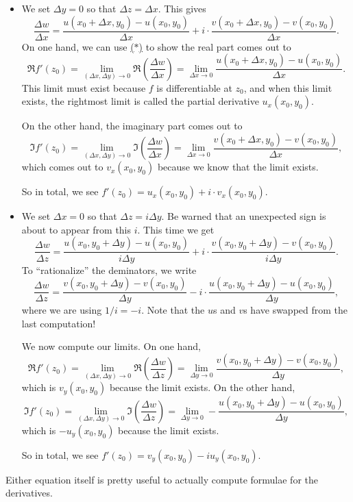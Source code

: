 \begin{itemize}
	\item We set $\Delta y=0$ so that $\Delta z=\Delta x$. This gives
	\[\frac{\Delta w}{\Delta x}=\frac{u(x_0+\Delta x,y_0)-u(x_0,y_0)}{\Delta x}+i\cdot\frac{v(x_0+\Delta x,y_0)-v(x_0,y_0)}{\Delta x}.\]
	On one hand, we can use \hyperref[eq:almostcauchyriemann]{($*$)} to show the real part comes out to
	\[\Re f'(z_0)=\lim_{(\Delta x,\Delta y)\to 0}\Re\left(\frac{\Delta w}{\Delta x}\right)=\lim_{\Delta x\to0}\frac{u(x_0+\Delta x,y_0)-u(x_0,y_0)}{\Delta x}.\]
	This limit must exist because $f$ is differentiable at $z_0$, and when this limit exists, the rightmost limit is called the partial derivative $u_x(x_0,y_0)$.
	
	On the other hand, the imaginary part comes out to
	\[\Im f'(z_0)=\lim_{(\Delta x,\Delta y)\to 0}\Im\left(\frac{\Delta w}{\Delta x}\right)=\lim_{\Delta x\to0}\frac{v(x_0+\Delta x,y_0)-v(x_0,y_0)}{\Delta x},\]
	which comes out to $v_x(x_0,y_0)$ because we know that the limit exists.

	So in total, we see $f'(z_0)=u_x(x_0,y_0)+i\cdot v_x(x_0,y_0)$.

	\item We set $\Delta x=0$ so that $\Delta z=i\Delta y$. Be warned that an unexpected sign is about to appear from this $i$. This time we get
	\[\frac{\Delta w}{\Delta z}=\frac{u(x_0,y_0+\Delta y)-u(x_0,y_0)}{i\Delta y}+i\cdot\frac{v(x_0,y_0+\Delta y)-v(x_0,y_0)}{i\Delta y}.\]
	To ``rationalize'' the deminators, we write
	\[\frac{\Delta w}{\Delta z}=\frac{v(x_0,y_0+\Delta y)-v(x_0,y_0)}{\Delta y}-i\cdot\frac{u(x_0,y_0+\Delta y)-u(x_0,y_0)}{\Delta y},\]
	where we are using $1/i=-i$. Note that the $u$s and $v$s have swapped from the last computation!

	We now compute our limits. On one hand,
	\[\Re f'(z_0)=\lim_{(\Delta x,\Delta y)\to0}\Re\left(\frac{\Delta w}{\Delta z}\right)=\lim_{\Delta y\to0}\frac{v(x_0,y_0+\Delta y)-v(x_0,y_0)}{\Delta y},\]
	which is $v_y(x_0,y_0)$ because the limit exists. On the other hand,
	\[\Im f'(z_0)=\lim_{(\Delta x,\Delta y)\to0}\Im\left(\frac{\Delta w}{\Delta z}\right)=\lim_{\Delta y\to0}-\frac{u(x_0,y_0+\Delta y)-u(x_0,y_0)}{\Delta y},\]
	which is $-u_y(x_0,y_0)$ because the limit exists.

	So in total, we see $f'(z_0)=v_y(x_0,y_0)-iu_y(x_0,y_0)$.
\end{itemize}
\begin{remark}
	Either equation itself is pretty useful to actually compute formulae for the derivatives.
\end{remark}
